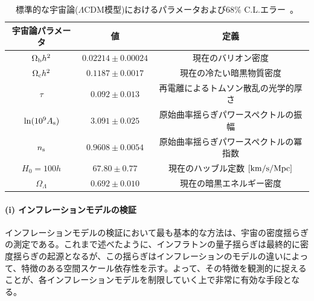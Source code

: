 

\begin{center}
\begin{table}[t]
\caption{
標準的な宇宙論($\Lambda$CDM模型)におけるパラメータおよび$68\%$ C.L.エラー~\citep{Ade:2013zuv}。
}
\begin{center}
 \vspace{15pt}
\begin{tabular}{ccc} \hline \hline 
宇宙論パラメータ & 値 & 定義 \\ 
\hline 
$\Omega_{\rm b}h^2$ & $0.02214\pm 0.00024$ & 現在のバリオン密度\\
$\Omega_{\rm c}h^2$& $0.1187\pm 0.0017$ & 現在の冷たい暗黒物質密度\\
$\tau$ & $0.092\pm 0.013$ & 再電離によるトムソン散乱の光学的厚さ\\
$\ln (10^9 A_{\rm s})$ & $3.091\pm 0.025$ & 原始曲率揺らぎパワースペクトルの振幅\\
$n_{\rm s}$ & $0.9608\pm 0.0054$ & 原始曲率揺らぎパワースペクトルの冪指数\\
$H_0=100h$ & $67.80\pm 0.77$ & 現在のハッブル定数 $[{\rm km}/{\rm s}/{\rm Mpc}]$\\
$\Omega_\Lambda$ & $0.692\pm 0.010$ & 現在の暗黒エネルギー密度\\
\hline
\hline 
\end{tabular}
\end{center}
\label{cosmological parameters1}
\end{table} 
\end{center}


\paragraph{(i) インフレーションモデルの検証}
%
インフレーションモデルの検証において最も基本的な方法は、宇宙の密度揺らぎの測定である。これまで述べたように、インフラトンの量子揺らぎは最終的に密度揺らぎの起源となるが、この揺らぎはインフレーションのモデルの違いによって、特徴のある空間スケール依存性を示す。よって、その特徴を観測的に捉えることが、各インフレーションモデルを制限していく上で非常に有効な手段となる。

